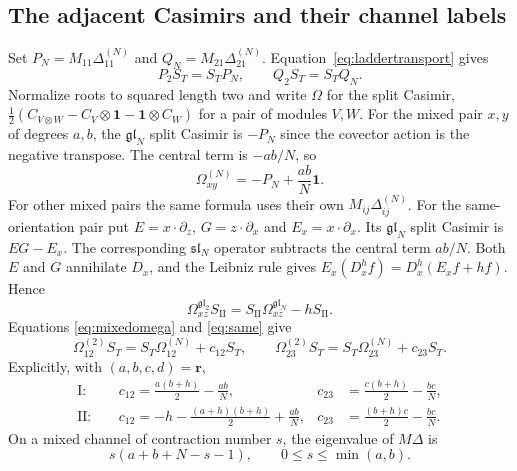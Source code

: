\documentclass[10pt,a4paper]{article}
\newcommand{\id}{\mathbf 1}
\begin{document}
\subsection{The adjacent Casimirs and their channel labels}
Set $P_N=M_{11}\Delta_{11}^{(N)}$ and
$Q_N=M_{21}\Delta_{21}^{(N)}$. Equation~\eqref{eq:laddertransport} gives
\begin{equation}\label{eq:mixedtransport}
 P_2S_T=S_TP_N,\qquad Q_2S_T=S_TQ_N.
\end{equation}
Normalize roots to squared length two and write $\Omega$ for the split
Casimir, $\tfrac12(C_{V\otimes W}-C_V\otimes\id-\id\otimes C_W)$
for a pair of modules $V,W$.
For the mixed pair $x,y$ of degrees $a,b$, the $\mathfrak{gl}_N$ split
Casimir is $-P_N$ since the covector action is the negative transpose.
The central term is $-ab/N$, so
\begin{equation}\label{eq:mixedomega}
 \Omega_{xy}^{(N)}=-P_N+\frac{ab}{N}\id.
\end{equation}
For other mixed pairs the same formula uses their own $M_{ij}\Delta_{ij}^{(N)}$.
For the same-orientation pair put
$E=x\cdot\partial_z$, $G=z\cdot\partial_x$ and $E_x=x\cdot\partial_x$.
Its $\mathfrak{gl}_N$ split Casimir is $EG-E_x$. The corresponding
$\mathfrak{sl}_N$ operator subtracts the central term $ab/N$.
Both $E$ and $G$ annihilate $D_x$, and the Leibniz rule gives
$E_x(D_x^h f)=D_x^h(E_x f+hf)$. Hence
\begin{equation}\label{eq:same}
 \Omega_{xz}^{\mathfrak{gl}_2}S_{\mathrm {II}}
 =S_{\mathrm {II}}\Omega_{xz}^{\mathfrak{gl}_N}-hS_{\mathrm {II}}.
\end{equation}
Equations \eqref{eq:mixedomega} and \eqref{eq:same} give
\begin{equation}\label{eq:affine}
 \Omega_{12}^{(2)}S_T=S_T\Omega_{12}^{(N)}+c_{12}S_T,
 \qquad
 \Omega_{23}^{(2)}S_T=S_T\Omega_{23}^{(N)}+c_{23}S_T.
\end{equation}
Explicitly, with $(a,b,c,d)=\boldsymbol r$,
\begin{align*}
 \mathrm I:\quad&c_{12}=\frac{a(b+h)}2-\frac{ab}{N},
 &c_{23}&=\frac{c(b+h)}2-\frac{bc}{N},\\
 \mathrm {II}:\quad&c_{12}=-h-\frac{(a+h)(b+h)}2+\frac{ab}{N},
 &c_{23}&=\frac{(b+h)c}2-\frac{bc}{N}.
\end{align*}
On a mixed channel of contraction number $s$, the eigenvalue of
$M\Delta$ is
\begin{equation}\label{eq:mixedspec}
 s(a+b+N-s-1),\qquad 0\le s\le\min(a,b).
\end{equation}
\end{document}
